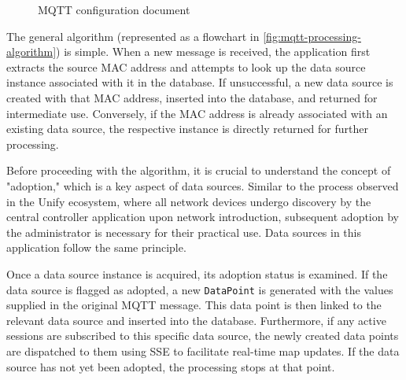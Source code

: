 \documentclass[FM,BP,EN,fonts]{tulthesis}
\begin{document}
\begin{figure}[ht]
    \centering
    \caption{MQTT configuration document}
    \label{fig:mqtt-config}
\end{figure}

The general algorithm (represented as a flowchart in \autoref{fig:mqtt-processing-algorithm}) is simple. When a new message is received, the application first extracts the source MAC address and attempts to look up the data source instance associated with it in the database. If unsuccessful, a new data source is created with that MAC address, inserted into the database, and returned for intermediate use. Conversely, if the MAC address is already associated with an existing data source, the respective instance is directly returned for further processing. 

Before proceeding with the algorithm, it is crucial to understand the concept of "adoption," which is a key aspect of data sources. Similar to the process observed in the Unify ecosystem, where all network devices undergo discovery by the central controller application upon network introduction, subsequent adoption by the administrator is necessary for their practical use. Data sources in this application follow the same principle. 

Once a data source instance is acquired, its adoption status is examined. If the data source is flagged as adopted, a new \verb|DataPoint| is generated with the values supplied in the original MQTT message. This data point is then linked to the relevant data source and inserted into the database. Furthermore, if any active sessions are subscribed to this specific data source, the newly created data points are dispatched to them using SSE to facilitate real-time map updates. If the data source has not yet been adopted, the processing stops at that point.
\end{document}
